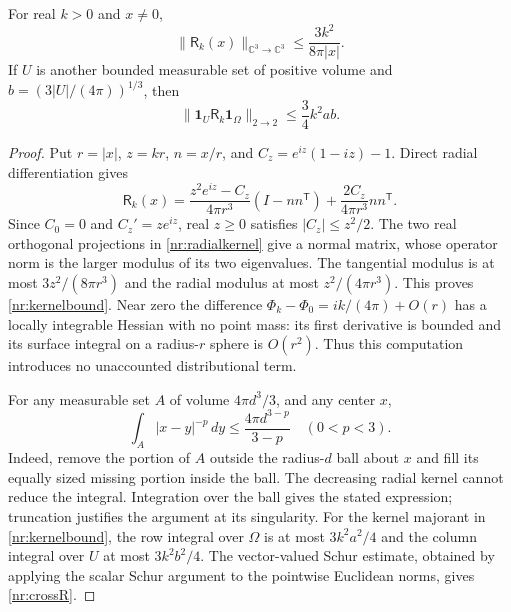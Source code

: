 \begin{lemma}
\label{nr:kernel}
For real $k>0$ and $x\ne0$,
\begin{equation}
 \|\mathsf R_k(x)\|_{\mathbb C^3\to\mathbb C^3}
 \leq\frac{3k^2}{8\pi|x|}.
 \label{nr:kernelbound}
\end{equation}
If $U$ is another bounded measurable set of positive volume and
$b=(3|U|/(4\pi))^{1/3}$, then
\begin{equation}
 \|\mathbf1_U\mathsf R_k\mathbf1_\Omega\|_{2\to2}
 \leq\frac34 k^2ab.
 \label{nr:crossR}
\end{equation}
\end{lemma}
\begin{proof}
Put $r=|x|$, $z=kr$, $n=x/r$, and
$C_z=e^{iz}(1-iz)-1$. Direct radial differentiation gives
\begin{equation}
 \mathsf R_k(x)
 =\frac{z^2e^{iz}-C_z}{4\pi r^3}(I-nn^{\mathsf T})
  +\frac{2C_z}{4\pi r^3}nn^{\mathsf T}.
 \label{nr:radialkernel}
\end{equation}
Since $C_0=0$ and $C_z'=ze^{iz}$, real $z\geq0$ satisfies
$|C_z|\leq z^2/2$. The two real orthogonal projections in
\eqref{nr:radialkernel} give a normal matrix, whose operator norm is the
larger modulus of its two eigenvalues. The tangential modulus is at most
$3z^2/(8\pi r^3)$ and the radial modulus at most $z^2/(4\pi r^3)$.
This proves \eqref{nr:kernelbound}. Near zero the difference
$\Phi_k-\Phi_0=ik/(4\pi)+O(r)$ has a locally integrable Hessian with
no point mass: its first derivative is bounded and its surface integral
on a radius-$r$ sphere is $O(r^2)$. Thus this computation introduces no
unaccounted distributional term.

For any measurable set $A$ of volume $4\pi d^3/3$, and any center $x$,
\begin{equation}
 \int_A |x-y|^{-p}\,dy\leq\frac{4\pi d^{3-p}}{3-p}
 \quad(0<p<3).
 \label{nr:rearrangement}
\end{equation}
Indeed, remove the portion of $A$ outside the radius-$d$ ball about $x$
and fill its equally sized missing portion inside the ball. The decreasing
radial kernel cannot reduce the integral. Integration over the ball gives
the stated expression; truncation justifies the argument at its singularity.
For the kernel majorant in \eqref{nr:kernelbound}, the row integral over
$\Omega$ is at most $3k^2a^2/4$ and the column integral over $U$ at most
$3k^2b^2/4$. The vector-valued Schur estimate, obtained by applying the
scalar Schur argument to the pointwise Euclidean norms, gives
\eqref{nr:crossR}.
\end{proof}

